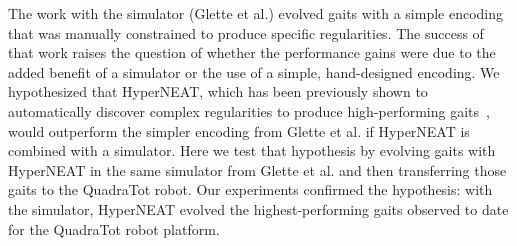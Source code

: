 The work with the simulator (Glette et al.) evolved gaits with a simple encoding that was manually constrained to produce specific regularities. The success of that work raises the question of whether the performance gains were due to the added benefit of a simulator or the use of a simple, hand-designed encoding. We hypothesized that HyperNEAT, which has been previously shown to automatically discover complex regularities to produce high-performing gaits~\cite{clune2011performance,yos:clune}, would outperform the simpler encoding from Glette et al. if HyperNEAT is combined with a simulator. 
Here we test that hypothesis by evolving gaits with HyperNEAT in the same simulator from Glette et al. and then transferring those gaits to the QuadraTot robot.  Our experiments confirmed the hypothesis: with the simulator, HyperNEAT evolved the highest-performing gaits observed to date for the QuadraTot robot platform. 




